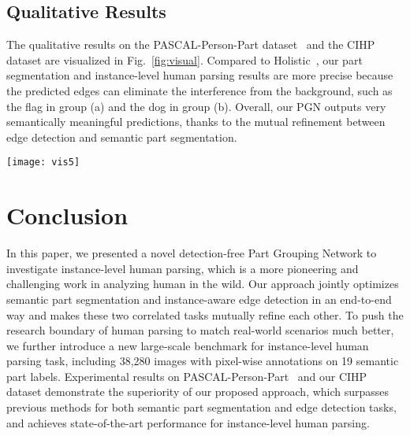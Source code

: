 \documentclass[runningheads]{llncs}
\begin{document}
\subsection{Qualitative Results}
The qualitative results on the PASCAL-Person-Part dataset~\cite{chen2014detect} and the CIHP dataset are visualized in Fig.~\ref{fig:visual}. Compared to Holistic~\cite{li2017holistic}, our part segmentation and instance-level human parsing results are more precise because the predicted edges can eliminate the interference from the background, such as the flag in group (a) and the dog in group (b). Overall, our PGN outputs very semantically meaningful predictions, thanks to the mutual refinement between edge detection and semantic part segmentation.

\begin{figure*}[t]
\centering
  \texttt{[image: vis5]}
\vspace{-2mm}
\caption{Left: Visualized results on the PASCAL-Person-Part dataset~\cite{chen2014detect}. In each group, the first line shows the input image, segmentation and instance results of Holistic~\cite{li2017holistic} (provided by the authors), and the results of our PGN are presented in the second line. Right: The images and the predicted resutls of edges, segmentation and instance-level human parsing by our PGN on the CIHP dataset are presented vertically.}
\vspace{-6mm}
\label{fig:visual}
\end{figure*}




\section{Conclusion}
In this paper, we presented a novel detection-free Part Grouping Network to investigate instance-level human parsing, which is a more pioneering and challenging work in analyzing human in the wild. Our approach jointly optimizes semantic part segmentation and instance-aware edge detection in an end-to-end way and makes these two correlated tasks mutually refine each other. To push the research boundary of human parsing to match real-world scenarios much better, we further introduce a new large-scale benchmark for instance-level human parsing task, including 38,280 images with pixel-wise annotations on 19 semantic part labels. Experimental results on PASCAL-Person-Part~\cite{chen2014detect} and our CIHP dataset demonstrate the superiority of our proposed approach, which surpasses previous methods for both semantic part segmentation and edge detection tasks, and achieves state-of-the-art performance for instance-level human parsing.






\end{document}
